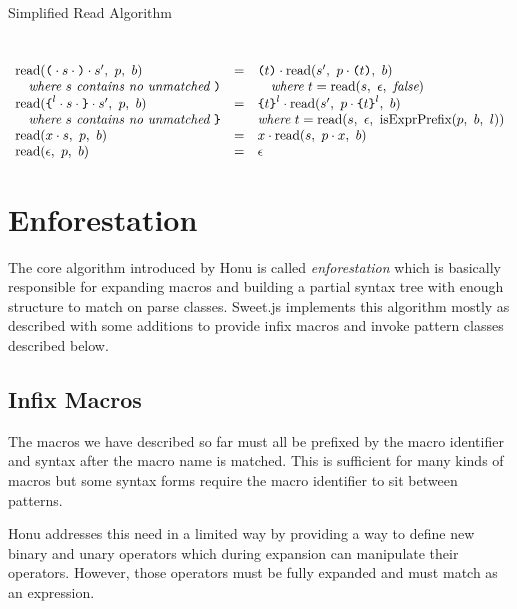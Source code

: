 \documentclass[onecolumn]{sigplanconf-onecolumn}
\begin{document}
\begin{displayfigure*}{\label{fig:simpleread}Simplified Read Algorithm}
\[\begin{array}{lcll}
    \\ \\
    

    \textrm{read}(\texttt{(} \cdot s \cdot \texttt{)} \cdot s',~p,~b)
    &=&
    \texttt{(}t\texttt{)} \cdot 
      \textrm{read}(s',~p \cdot \texttt{(}t\texttt{)},~b)
    
    \\
    \quad \textit{where}~s~\textit{contains no unmatched}~\texttt{)} 
    &&\quad \textit{where}~t = \textrm{read}(s,~\epsilon,~\textit{false}) 
    \\
    \textrm{read}(
      \texttt{\{}^l \cdot s \cdot \texttt{\}} \cdot s'
    ,~p,~b)
    &=&
    \texttt{\{}t\texttt{\}}^l \cdot 
      \textrm{read}(s',~
        p \cdot \texttt{\{}t\texttt{\}}^l
      ,~b)
    
    \\
    \quad \textit{where}~s~\textit{contains no unmatched}~\texttt{\}} 
    && \textit{where}~t = \textrm{read}(s,~\epsilon,~\textrm{isExprPrefix}(p,~b,~l))
    \\
    \textrm{read}(x \cdot s,~p,~b)
    &=&
    x \cdot 
      \textrm{read}(s,~p \cdot x,~b)
   
    \\
    \textrm{read}(\epsilon,~p,~b)
    &=&
    \epsilon \\
  \end{array}
\]
\end{displayfigure*}


\section{Enforestation}
\label{sec-4}

The core algorithm introduced by Honu is called \emph{enforestation} which
is basically responsible for expanding macros and building a partial
syntax tree with enough structure to match on parse classes. Sweet.js
implements this algorithm mostly as described with some additions to
provide infix macros and invoke pattern classes described below.

\subsection{Infix Macros}
\label{sec-4-1}
The macros we have described so far must all be prefixed by the macro
identifier and syntax after the macro name is matched. This is
sufficient for many kinds of macros but some syntax forms require the
macro identifier to sit between patterns.

Honu addresses this need in a limited way by providing a way to define
new binary and unary operators which during expansion can manipulate
their operators. However, those operators must be fully expanded and
must match as an expression.
\end{document}
